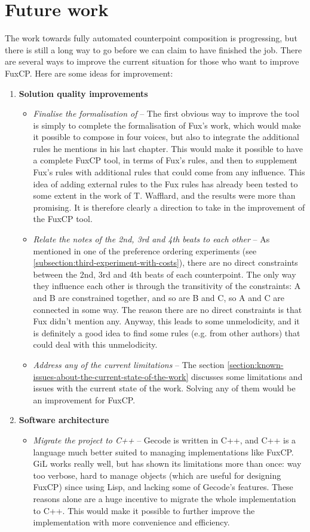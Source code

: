 \section{Future work}
The work towards fully automated counterpoint composition is progressing, but there is still a long way to go before we can claim to have finished the job. There are several ways to improve the current situation for those who want to improve FuxCP. Here are some ideas for improvement:
\begin{enumerate}
  \item \textbf{Solution quality improvements}
  \begin{itemize}
    \item \textit{Finalise the formalisation of \gap} -- The first obvious way to improve the tool is simply to complete the formalisation of Fux's work, which would make it possible to compose in four voices, but also to integrate the additional rules he mentions in his last chapter. This would make it possible to have a complete FuxCP tool, in terms of Fux's rules, and then to supplement Fux's rules with additional rules that could come from any influence. This idea of adding external rules to the Fux rules has already been tested to some extent in the work of T. Wafflard, and the results were more than promising. It is therefore clearly a direction to take in the improvement of the FuxCP tool.
    \item \textit{Relate the notes of the 2nd, 3rd and 4th beats to each other} -- As mentioned in one of the preference ordering experiments (see \ref{subsection:third-experiment-with-costs}), there are no direct constraints between the 2nd, 3rd and 4th beats of each counterpoint. The only way they influence each other is through the transitivity of the constraints: A and B are constrained together, and so are B and C, so A and C are connected in some way. The reason there are no direct constraints is that Fux didn't mention any. Anyway, this leads to some unmelodicity, and it is definitely a good idea to find some rules (e.g. from other authors) that could deal with this unmelodicity. 
    \item \textit{Address any of the current limitations} -- The section \ref{section:known-issues-about-the-current-state-of-the-work} discusses some limitations and issues with the current state of the work. Solving any of them would be an improvement for FuxCP.
  \end{itemize}
  
  
  \item \textbf{Software architecture}
  \begin{itemize}
    \item \textit{Migrate the project to C++} -- Gecode is written in C++, and C++ is a language much better suited to managing implementations like FuxCP. GiL works really well, but has shown its limitations more than once: way too verbose, hard to manage objects (which are useful for designing FuxCP) since using Lisp, and lacking some of Gecode's features. These reasons alone are a huge incentive to migrate the whole implementation to C++. This would make it possible to further improve the implementation with more convenience and efficiency.
    

\end{itemize}
\end{enumerate}
